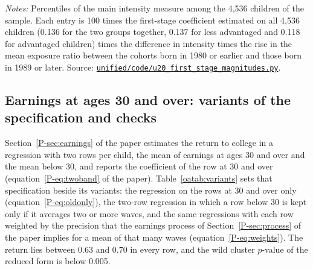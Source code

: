 \documentclass[11pt]{article}
\numberwithin{equation}{section}
\newcommand{\repourl}{https://github.com/JiachenJin1001/before-the-labor-market-or-inside-it}
\newcommand{\code}[1]{\href{\repourl/blob/main/#1}{\nolinkurl{#1}}}
\begin{document}
\begin{table}[H]
\centering
\small
\caption{The first stage in percentage points of college completion, for four contrasts of provincial intensity.}
\label{oatab:fsmag}
\setlength{\tabcolsep}{4pt}

\par\smallskip
\begin{minipage}{0.94\textwidth}
\footnotesize\emph{Notes:} Percentiles of the main intensity measure among the 4,536 children of the sample. Each entry is 100 times the first-stage coefficient estimated on all 4,536 children (0.136 for the two groups together, 0.137 for less advantaged and 0.118 for advantaged children) times the difference in intensity times the rise in the mean exposure ratio between the cohorts born in 1980 or earlier and those born in 1989 or later. Source: \code{unified/code/u20_first_stage_magnitudes.py}.
\end{minipage}
\end{table}

\subsection{Earnings at ages 30 and over: variants of the specification and checks}


Section~\ref{P-sec:earnings} of the paper estimates the return to
college in a regression with two rows per child, the mean of earnings
at ages 30 and over and the mean below 30, and reports the coefficient
of the row at 30 and over (equation~\eqref{P-eq:twoband} of the paper).
Table~\ref{oatab:variants} sets that specification beside its variants:
the regression on the rows at 30 and over only
(equation~\eqref{P-eq:oldonly}), the two-row regression in which a row
below 30 is kept only if it averages two or more waves, and the same
regressions with each row weighted by the precision that the earnings
process of Section~\ref{P-sec:process} of the paper implies for a mean
of that many waves (equation~\eqref{P-eq:weights}). The return lies
between 0.63 and 0.70 in every row, and the wild cluster $p$-value of
the reduced form is below 0.005.
\end{document}
